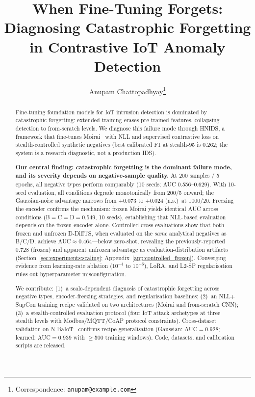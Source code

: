 \documentclass{article}
\title{When Fine-Tuning Forgets: Diagnosing Catastrophic Forgetting\\
       in Contrastive IoT Anomaly Detection}
\author{
  Anupam Chattopadhyay\thanks{Correspondence: \texttt{anupam@example.com}} \\
}
\newcommand{\ours}{\textsc{HNIDS}}     %
\begin{document}
\maketitle

\begin{abstract}
Fine-tuning foundation models for IoT intrusion detection is dominated by
catastrophic forgetting: extended training erases pre-trained features,
collapsing detection to from-scratch levels.
We diagnose this failure mode through \ours{}, a framework that fine-tunes
Moirai~\cite{woo2024moirai} with NLL and supervised contrastive loss on
stealth-controlled synthetic negatives (best calibrated F1 at stealth-95
is 0.262; the system is a research diagnostic, not a production IDS).

\textbf{Our central finding: catastrophic forgetting is the dominant failure
mode, and its severity depends on negative-sample quality.}
At 200 samples / 5 epochs, all negative types perform comparably
(10 seeds; AUC 0.556--0.629).
With 10-seed evaluation, all conditions degrade monotonically from 200/5
onward; the Gaussian-noise advantage narrows from $+$0.073 to $+$0.024
(n.s.)\ at 1000/20.
Freezing the encoder confirms the mechanism: frozen Moirai yields
identical AUC across conditions (B$=$C$=$D$=$0.549, 10 seeds),
establishing that NLL-based evaluation depends on the frozen encoder
alone.
Controlled cross-evaluations show that both frozen and unfrozen
D-DiffTS, when evaluated on the \emph{same} analytical negatives as B/C/D,
achieve AUC$\approx$0.464---below zero-shot, revealing the previously-reported
0.728 (frozen) and apparent unfrozen advantage as evaluation-distribution
artifacts (Section~\ref{sec:experiments:scaling}; Appendix~\ref{app:controlled_frozen}).
Converging evidence from learning-rate ablation ($10^{-4}$ to $10^{-6}$),
LoRA, and L2-SP regularisation rules out hyperparameter misconfiguration.

We contribute: (1)~a scale-dependent diagnosis of catastrophic forgetting
across negative types, encoder-freezing strategies, and regularisation
baselines; (2)~an NLL$+$SupCon training recipe validated on two architectures
(Moirai and from-scratch CNN); (3)~a stealth-controlled evaluation
protocol (four IoT attack archetypes at three stealth levels with
Modbus/MQTT/CoAP protocol constraints).
Cross-dataset validation on N-BaIoT~\cite{meidan2018n} confirms recipe
generalisation (Gaussian: AUC$=$0.928; learned: AUC$=$0.939
with $\geq$500 training windows).
Code, datasets, and calibration scripts are released.
\end{abstract}












\end{document}
